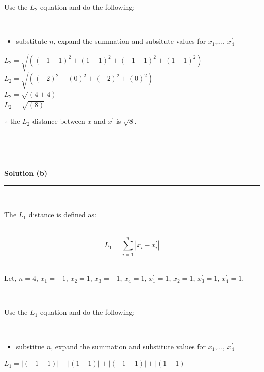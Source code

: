 \documentclass{article}
\begin{document}
\parbox{\textwidth}{Use the $L_2$ equation and do the following:}\\

\begin{itemize}
    \item {substitute $n$, expand the summation and subsitute values for $x_1$,..., $x^{\prime}_4$}\\
\end{itemize}

$L_2 = \sqrt{\left((-1 - 1)^2+(1 - 1)^2+(-1 - 1)^2+(1 - 1)^2\right)}$\\

$L_2 = \sqrt{\left((-2)^2+(0)^2+(-2)^2+(0)^2\right)}$\\

$L_2 = \sqrt{\left(4+4\right)}$\\

$L_2 = \sqrt{\left(8\right)}$\\

\parbox{\textwidth}{$\therefore$ the $L_2$ distance between $x$ and $x^{\prime}$ is $\sqrt{8}$.}\\

\noindent\rule{\textwidth}{0.4pt}\\

\textbf{Solution (b)}

\noindent\rule{\textwidth}{0.4pt}\\

\parbox{\textwidth}{The $L_1$ distance is defined as:}\\

$$L_1 = \sum_{i=1}^{n} |x_i - x^{\prime}_i|$$\\

\parbox{\textwidth}{Let, $n = 4$, $x_1 = -1$, $x_2 = 1$, $x_3 = -1$, $x_4 = 1$, $x^{\prime}_1 = 1$, $x^{\prime}_2 = 1$, $x^{\prime}_3 = 1$, $x^{\prime}_4 = 1$.}\\

\parbox{\textwidth}{Use the $L_1$ equation and do the following:}\\

\begin{itemize}
    \item {substitue $n$, expand the summation and substitute values for $x_1$,..., $x^{\prime}_4$}\\
\end{itemize}

$L_1 = |(-1 - 1)| + |(1 - 1)| + |(-1 - 1)| + |(1 - 1)|$\\
\end{document}
